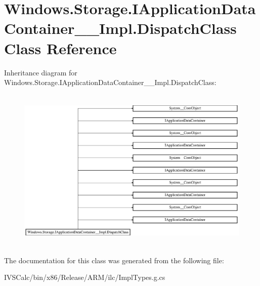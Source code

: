 \hypertarget{class_windows_1_1_storage_1_1_i_application_data_container_____impl_1_1_dispatch_class}{}\section{Windows.\+Storage.\+I\+Application\+Data\+Container\+\_\+\+\_\+\+Impl.\+Dispatch\+Class Class Reference}
\label{class_windows_1_1_storage_1_1_i_application_data_container_____impl_1_1_dispatch_class}
Inheritance diagram for Windows.\+Storage.\+I\+Application\+Data\+Container\+\_\+\+\_\+\+Impl.\+Dispatch\+Class\+:\begin{figure}[H]
\begin{center}
\leavevmode
\includegraphics[height=7.917737cm]{class_windows_1_1_storage_1_1_i_application_data_container_____impl_1_1_dispatch_class}
\end{center}
\end{figure}


The documentation for this class was generated from the following file\+:\begin{DoxyCompactItemize}
\item 
I\+V\+S\+Calc/bin/x86/\+Release/\+A\+R\+M/ilc/Impl\+Types.\+g.\+cs\end{DoxyCompactItemize}

